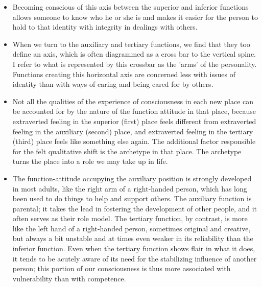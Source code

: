 \begin{itemize}

\item Becoming conscious of this axis between the superior and inferior
functions allows someone to know who he or she is and makes it easier for the
person to hold to that identity with integrity in dealings with others.

\item When we turn to the auxiliary and tertiary functions, we find that they
too define an axis, which is often diagrammed as a cross bar to the vertical
spine. I refer to what is represented by this crossbar as the 'arms' of the
personality. Functions creating this horizontal axis are concerned less with
issues of identity than with ways of caring and being cared for by others.

\item Not all the qualities of the experience of consciousness in each new
place can be accounted for by the nature of the function attitude in that
place, because extraverted feeling in the superior (first) place feels
different from extraverted feeling in the auxiliary (second) place, and
extraverted feeling in the tertiary (third) place feels like something else
again. The additional factor responsible for the felt qualitative shift is the
archetype in that place. The archetype turns the place into a role we may take
up in life.

\item The function-attitude occupying the auxiliary position is strongly
developed in most adults, like the right arm of a right-handed person, which
has long been used to do things to help and support others. The auxiliary
function is parental; it takes the lead in fostering the development of other
people, and it often serves as their role model. The tertiary function, by
contrast, is more like the left hand of a right-handed person, sometimes
original and creative, but always a bit unstable and at times even weaker in
its reliability than the inferior function. Even when the tertiary function
shows flair in what it does, it tends to be acutely aware of its need for the
stabilizing influence of another person; this portion of our consciousness is
thus more associated with vulnerability than with competence.


\end{itemize}
